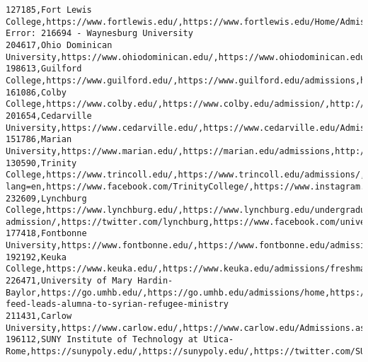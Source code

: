 \documentclass[11pt]{article}
\begin{document}
\begin{Verbatim}[commandchars=\\\{\}]
127185,Fort Lewis College,https://www.fortlewis.edu/,https://www.fortlewis.edu/Home/Admission/AdmissiontoFortLewisCollege.aspx,https://twitter.com/FLCDurango,http://www.facebook.com/FortLewis,https://www.instagram.com/p/BpaJHA2HfJ\_/
Error: 216694 - Waynesburg University
204617,Ohio Dominican University,https://www.ohiodominican.edu/,https://www.ohiodominican.edu/admissions,http://twitter.com/OhioDominican,http://www.facebook.com/OhioDominican,http://instagram.com/ohiodominican
198613,Guilford College,https://www.guilford.edu/,https://www.guilford.edu/admissions,https://twitter.com/GuilfordCollege,https://www.facebook.com/guilfordcollege/,https://instagram.com/guilfordcollege/
161086,Colby College,https://www.colby.edu/,https://www.colby.edu/admission/,http://www.twitter.com/colbycollege,http://www.facebook.com/colbycollege,https://www.instagram.com/thiscolbylife/
201654,Cedarville University,https://www.cedarville.edu/,https://www.cedarville.edu/Admissions.aspx,https://twitter.com/cedarville,https://www.facebook.com/cedarville/,https://www.instagram.com/cedarville/
151786,Marian University,https://www.marian.edu/,https://marian.edu/admissions,http://twitter.com/marianuniv,https://www.facebook.com/marianuniversity,http://instagram.com/marianuniversity
130590,Trinity College,https://www.trincoll.edu/,https://www.trincoll.edu/admissions/,https://twitter.com/trinitycollege?lang=en,https://www.facebook.com/TrinityCollege/,https://www.instagram.com/trinitycollege/
232609,Lynchburg College,https://www.lynchburg.edu/,https://www.lynchburg.edu/undergraduate-admission/,https://twitter.com/lynchburg,https://www.facebook.com/university.of.lynchburg/,https://www.instagram.com/university.of.lynchburg/
177418,Fontbonne University,https://www.fontbonne.edu/,https://www.fontbonne.edu/admission/,http://www.twitter.com/FontbonneU,http://www.facebook.com/Fontbonne,http://instagram.com/fontbonneu
192192,Keuka College,https://www.keuka.edu/,https://www.keuka.edu/admissions/freshman,http://www.twitter.com/keukacollege,http://www.facebook.com/keukacollege,http://www.instagram.com/keukacollege
226471,University of Mary Hardin-Baylor,https://go.umhb.edu/,https://go.umhb.edu/admissions/home,https://twitter.com/umhb,https://facebook.com/umhb,https://go.umhb.edu/news/2018/instagram-feed-leads-alumna-to-syrian-refugee-ministry
211431,Carlow University,https://www.carlow.edu/,https://www.carlow.edu/Admissions.aspx,http://twitter.com/CarlowU,https://www.facebook.com/CarlowUniversity,https://instagram.com/carlowuniversity/
196112,SUNY Institute of Technology at Utica-Rome,https://sunypoly.edu/,https://sunypoly.edu/,https://twitter.com/SUNYPolyInst,https://www.facebook.com/sunypolytechnic,https://www.instagram.com/p/BpcUC1ngSeO/

\end{Verbatim}
\end{document}
